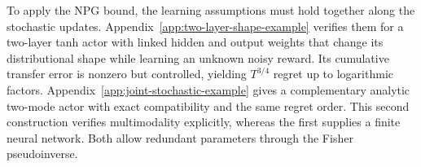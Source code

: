 \begin{exmp}
To apply the NPG bound, the learning assumptions must hold together along the stochastic updates. Appendix~\ref{app:two-layer-shape-example} verifies them for a two-layer tanh actor with linked hidden and output weights that change its distributional shape while learning an unknown noisy reward. Its cumulative transfer error is nonzero but controlled, yielding $T^{3/4}$ regret up to logarithmic factors. Appendix~\ref{app:joint-stochastic-example} gives a complementary analytic two-mode actor with exact compatibility and the same regret order. This second construction verifies multimodality explicitly, whereas the first supplies a finite neural network. Both allow redundant parameters through the Fisher pseudoinverse.
\end{exmp}













